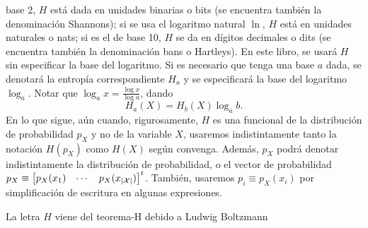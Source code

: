 base 2, $H$ est\'a  dada en unidades binarias o bits  (se encuentra tambi\'en la
denominaci\'on Shannons);  si se usa el  logaritmo natural $\ln$, $H$  est\'a en
unidades naturales o nats; si es el de base 10, $H$ se da en d\'igitos decimales
o dits  (se encuentra  tambi\'en la  denominaci\'on bans  o Hartleys).   En este
libro, se  usar\'a $H$ sin especificar  la base del logaritmo.   Si es necesario
que tenga una base $a$ dada, se denotar\'a la entrop\'ia correspondiente $H_a$ y
se  especificar\'a  la  base  del  logaritmo  $\log_a$.   Notar  que  $\log_a  x
= \frac{\log x}{\log a}$, dando
%
\[
H_a(X)  =  H_b(X)  \log_a b.
\]
%
En  lo que  sigue,  a\'un cuando,  rigurosamente,  $H$ es  una  funcional de  la
distribuci\'on  de  probabilidad  $p_X$  y  no  de  la  variable  $X$,  usaremos
indistintamente  tanto  la notaci\'on  $H(p_X)$  como  $H(X)$ seg\'un  convenga.
Adem\'as,   $p_X$  podr\'a   denotar   indistintamente   la  distribuci\'on   de
probabilidad, o el  vector de probabilidad $p_X  \equiv \begin{bmatrix} p_X(x_1)
&  \cdots  & p_X(x_{|\mathcal{X}|})  \end{bmatrix}^t$.   Tambi\'en,  usaremos $p_i  \equiv
p_X(x_i)$ por simplificaci\'on de escritura en algunas expresiones.

    La  letra   $H$   viene  del   teorema-H   debido  a   Ludwig
  Boltzmann~\cite{Jay65,  Mer10, Mer18}

